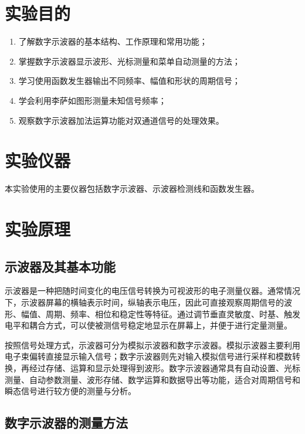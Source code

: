 \documentclass{../template/myrpt}
\begin{document}
\maketitle

\section{实验目的}
\begin{enumerate}[label=\arabic*. ]
  \item 了解数字示波器的基本结构、工作原理和常用功能；
  \item 掌握数字示波器显示波形、光标测量和菜单自动测量的方法；
  \item 学习使用函数发生器输出不同频率、幅值和形状的周期信号；
  \item 学会利用李萨如图形测量未知信号频率；
  \item 观察数字示波器加法运算功能对双通道信号的处理效果。
\end{enumerate}

\section{实验仪器}

本实验使用的主要仪器包括数字示波器、示波器检测线和函数发生器。

\section{实验原理}

\subsection{示波器及其基本功能}

示波器是一种把随时间变化的电压信号转换为可视波形的电子测量仪器。通常情况下，示波器屏幕的横轴表示时间，纵轴表示电压，因此可直接观察周期信号的波形、幅值、周期、频率、相位和稳定性等特征。通过调节垂直灵敏度、时基、触发电平和耦合方式，可以使被测信号稳定地显示在屏幕上，并便于进行定量测量。

按照信号处理方式，示波器可分为模拟示波器和数字示波器。模拟示波器主要利用电子束偏转直接显示输入信号；数字示波器则先对输入模拟信号进行采样和模数转换，再经过存储、运算和显示处理得到波形。数字示波器通常具有自动设置、光标测量、自动参数测量、波形存储、数学运算和数据导出等功能，适合对周期信号和瞬态信号进行较方便的测量与分析。

\subsection{数字示波器的测量方法}
\end{document}
